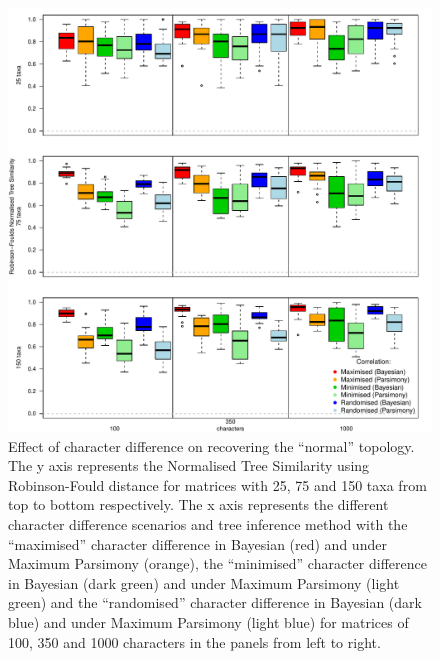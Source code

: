 \documentclass[12pt,letterpaper]{article}
\begin{document}
\begin{figure}[!htbp]
\centering
   \includegraphics[width=1\textwidth]{Figures/RF_results_best.pdf}
\caption{\small{Effect of character difference on recovering the ``normal'' topology. The y axis represents the Normalised Tree Similarity using Robinson-Fould distance for matrices with 25, 75 and 150 taxa from top to bottom respectively. The x axis represents the different character difference scenarios and tree inference method with the ``maximised'' character difference in Bayesian (red) and under Maximum Parsimony (orange), the ``minimised'' character difference in Bayesian (dark green) and under Maximum Parsimony (light green) and the ``randomised'' character difference in Bayesian (dark blue) and under Maximum Parsimony (light blue) for matrices of 100, 350 and 1000 characters in the panels from left to right.}}
\label{Fig:RF_results_best}
\end{figure}
\end{document}
